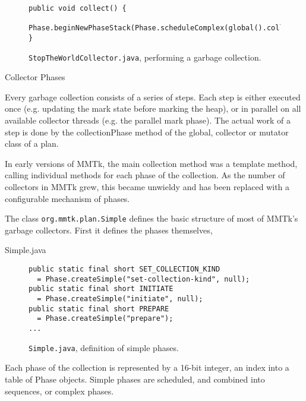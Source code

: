 \begin{figure}[h]
\begin{lstlisting}
public void collect() {
  Phase.beginNewPhaseStack(Phase.scheduleComplex(global().collection));
}
\end{lstlisting}
\caption{\lstinline|StopTheWorldCollector.java|, performing a garbage
collection.}
\label{fig:gc:stw-collect}
\end{figure}
Collector Phases

Every garbage collection consists of a series of steps.  
Each step is either executed once (e.g. updating the mark 
state before marking the heap), or in parallel on all 
available collector threads (e.g. the parallel mark phase).  
The actual work of a step is done by the collectionPhase 
method of the global, collector or mutator class of a plan.

In early versions of MMTk, the main collection method was a template method, 
calling individual methods for each phase of the collection.  As the number 
of collectors in MMTk grew, this became unwieldy and has been 
replaced with a configurable mechanism of phases.  

The class \lstinline|org.mmtk.plan.Simple| defines the basic structure of most
of MMTk's garbage collectors.  First it defines the phases themselves,

Simple.java
\begin{figure}[h]
\begin{lstlisting}
public static final short SET_COLLECTION_KIND 
  = Phase.createSimple("set-collection-kind", null);
public static final short INITIATE            
  = Phase.createSimple("initiate", null);
public static final short PREPARE             
  = Phase.createSimple("prepare");
...
\end{lstlisting}
\caption{\lstinline|Simple.java|, definition of simple phases.}
\label{fig:gc:simplephase}
\end{figure}
Each phase of the collection is represented by a 16-bit integer, 
an index into a table of Phase objects.  Simple phases are scheduled, 
and combined into sequences, or complex phases.

